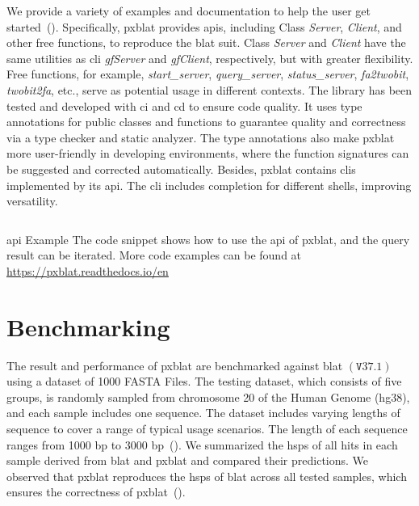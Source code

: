 \documentclass[unnumsec,webpdf,contemporary,large,namedate]{oup-authoring-template}%
\theoremstyle{thmstyleone}%
\theoremstyle{thmstyletwo}%
\theoremstyle{thmstylethree}%
\newcommand\pCref[1]{(\Cref{#1})}
\begin{document}
We provide a variety of examples and documentation to help the user get started~\pCref{listing:example}.
Specifically, \gls{pxblat} provides \glspl{api}, including Class \emph{Server}, \emph{Client}, and other free functions, to reproduce the \gls{blat} suit.
Class \emph{Server} and \emph{Client} have the same utilities as \gls{cli} \emph{gfServer} and \emph{gfClient}, respectively, but with greater flexibility.
Free functions, for example, \emph{start\_server}, \emph{query\_server}, \emph{status\_server}, \emph{fa2twobit}, \emph{twobit2fa}, etc., serve as potential usage in different contexts.
The library has been tested and developed with \gls{ci} and \gls{cd} to ensure code quality.
It uses type annotations for public classes and functions to guarantee quality and correctness via a type checker and static analyzer.
The type annotations also make \gls{pxblat} more user-friendly in developing environments, where the function signatures can be suggested and corrected automatically.
Besides, \gls{pxblat} contains \glspl{cli} implemented by its \gls{api}.
The \gls{cli} includes completion for different shells, improving versatility.

\begin{listing}
	\inputminted[breaklines]{python}{codes/example1.py}
	\caption{\gls{api} Example The code snippet shows how to use the \gls{api} of \gls{pxblat},
		and the query result can be iterated. More code examples can be found at \url{https://pxblat.readthedocs.io/en}}
	\label{listing:example}
\end{listing}



\section{Benchmarking}\label{sec:benchmarking}

The result and performance of \gls{pxblat} are benchmarked against \gls{blat} \(\left(\mathtt{V}37.1\right)\) using a dataset of \num[round-mode=places, round-precision=0]{1000} FASTA Files.
The testing dataset, which consists of five groups, is randomly sampled from chromosome \num[round-mode=places, round-precision=0]{20} of the Human Genome (hg38), and each sample includes one sequence.
The dataset includes varying lengths of sequence to cover a range of typical usage scenarios.
The length of each sequence ranges from \num[round-mode=places, round-precision=0]{1000} bp to \num[round-mode=places, round-precision=0]{3000} bp~\pCref{suppfig:fas-len}.
We summarized the \glspl{hsp} of all hits in each sample derived from \gls{blat} and \gls{pxblat} and compared their predictions. We observed that \gls{pxblat} reproduces the \glspl{hsp} of \gls{blat} across all tested samples, which ensures the correctness of \gls{pxblat}~\pCref{supptab:cmp1}.
\end{document}
